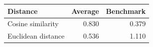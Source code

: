 
\begin{tabular}{lrr}
\toprule
Distance & Average & Benchmark\\
\midrule
Cosine similarity & 0.830 & 0.379\\
Euclidean distance & 0.536 & 1.110\\
\bottomrule
\end{tabular}
